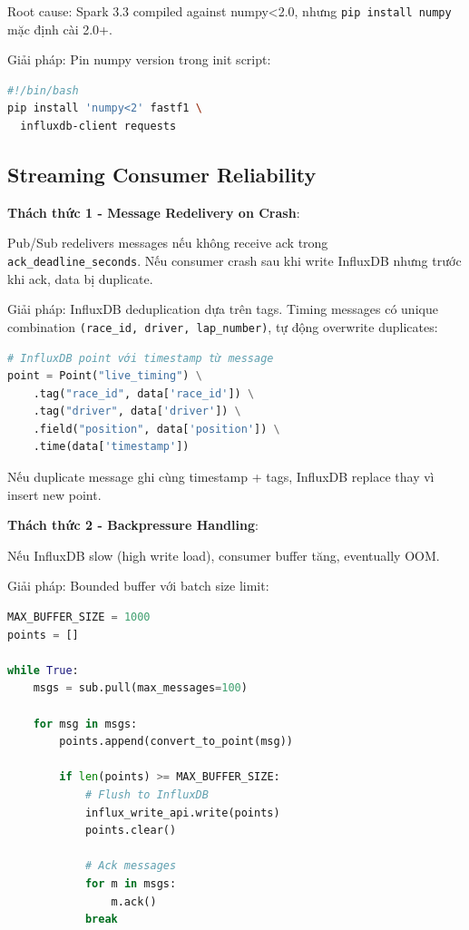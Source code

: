 \documentclass[conference,10pt]{IEEEtran}
\begin{document}
Root cause: Spark 3.3 compiled against numpy<2.0, nhưng \texttt{pip install numpy} mặc định cài 2.0+.

Giải pháp: Pin numpy version trong init script:
\begin{lstlisting}[language=bash]
#!/bin/bash
pip install 'numpy<2' fastf1 \
  influxdb-client requests
\end{lstlisting}

\subsection{Streaming Consumer Reliability}

\textbf{Thách thức 1 - Message Redelivery on Crash}:

Pub/Sub redelivers messages nếu không receive ack trong \texttt{ack\_deadline\_seconds}. Nếu consumer crash sau khi write InfluxDB nhưng trước khi ack, data bị duplicate.

Giải pháp: InfluxDB deduplication dựa trên tags. Timing messages có unique combination \texttt{(race\_id, driver, lap\_number)}, tự động overwrite duplicates:

\begin{lstlisting}[language=python]
# InfluxDB point với timestamp từ message
point = Point("live_timing") \
    .tag("race_id", data['race_id']) \
    .tag("driver", data['driver']) \
    .field("position", data['position']) \
    .time(data['timestamp'])
\end{lstlisting}

Nếu duplicate message ghi cùng timestamp + tags, InfluxDB replace thay vì insert new point.

\textbf{Thách thức 2 - Backpressure Handling}:

Nếu InfluxDB slow (high write load), consumer buffer tăng, eventually OOM.

Giải pháp: Bounded buffer với batch size limit:

\begin{lstlisting}[language=Python]
MAX_BUFFER_SIZE = 1000
points = []

while True:
    msgs = sub.pull(max_messages=100)

    for msg in msgs:
        points.append(convert_to_point(msg))

        if len(points) >= MAX_BUFFER_SIZE:
            # Flush to InfluxDB
            influx_write_api.write(points)
            points.clear()

            # Ack messages
            for m in msgs:
                m.ack()
            break
\end{lstlisting}
\end{document}
